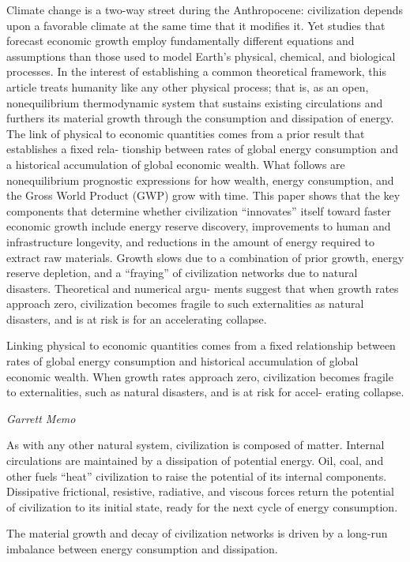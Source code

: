 \documentclass[
]{book}
\begin{document}
Climate change is a two-way street during the Anthropocene: civilization depends upon a
favorable climate at the same time that it modiﬁes it. Yet studies that forecast economic growth employ
fundamentally diﬀerent equations and assumptions than those used to model Earth's physical, chemical,
and biological processes. In the interest of establishing a common theoretical framework, this article treats
humanity like any other physical process; that is, as an open, nonequilibrium thermodynamic system that
sustains existing circulations and furthers its material growth through the consumption and dissipation of
energy. The link of physical to economic quantities comes from a prior result that establishes a ﬁxed rela-
tionship between rates of global energy consumption and a historical accumulation of global economic
wealth. What follows are nonequilibrium prognostic expressions for how wealth, energy consumption,
and the Gross World Product (GWP) grow with time. This paper shows that the key components that
determine whether civilization ``innovates'' itself toward faster economic growth include energy reserve
discovery, improvements to human and infrastructure longevity, and reductions in the amount of energy
required to extract raw materials. Growth slows due to a combination of prior growth, energy reserve
depletion, and a ``fraying'' of civilization networks due to natural disasters. Theoretical and numerical argu-
ments suggest that when growth rates approach zero, civilization becomes fragile to such externalities as
natural disasters, and is at risk is for an accelerating collapse.

Linking physical to economic quantities comes from a ﬁxed relationship between rates
of global energy consumption and historical accumulation of global economic wealth. When growth rates
approach zero, civilization becomes fragile to externalities, such as natural disasters, and is at risk for accel-
erating collapse.

\emph{Garrett Memo}

As with any other natural system, civilization is composed of matter. Internal circulations are maintained
by a dissipation of potential energy. Oil, coal, and other fuels ``heat'' civilization to raise the potential of its
internal components. Dissipative frictional, resistive, radiative, and viscous forces return the potential of
civilization to its initial state, ready for the next cycle of energy consumption.

The material growth and decay of civilization networks is
driven by a long-run imbalance between energy consumption and dissipation.
\end{document}
